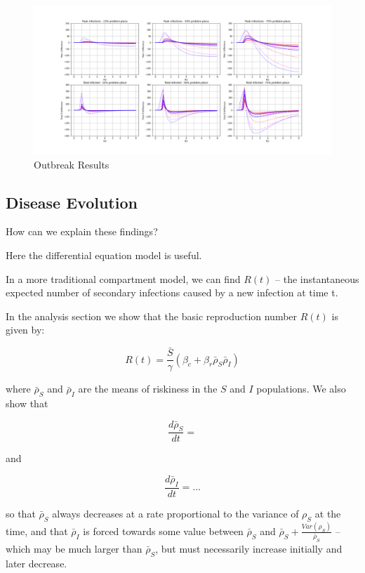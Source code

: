 \documentclass{article}
\begin{document}
\begin{figure}
\centering
\includegraphics[width=\textwidth]{outbreakresults}
\caption{Outbreak Results}
\label{fig:outbreak_results}
\end{figure}


\subsection{Disease Evolution}

How can we explain these findings?

Here the differential equation model is useful.

In a more traditional compartment model, we can find $R(t)$ – the instantaneous
expected number of secondary infections caused by a new infection at time t.

In the analysis section we show that the basic reproduction number $R(t)$ is
given by:

$$R(t) = \frac{\bar S}{\gamma} \left( \beta_c
		+ \beta_r \bar \rho_S \bar \rho_I \right)$$

where $\bar\rho_S$ and $\bar\rho_I$ are the means of riskiness in the $S$ and
$I$ populations. We also show that


\begin{equation}
\frac{d\bar\rho_S}{dt} = 
\end{equation}

and

$$\frac{d\bar\rho_I}{dt} = ...$$

so that $\bar\rho_S$ always decreases at a rate proportional to the
variance of $\rho_S$ at the time, and that $\bar\rho_I$ is forced towards
some value between $\bar\rho_S$ and $\bar\rho_S + \frac{Var(\rho_S)}{\bar\rho_S}$
– which may be much larger than $\bar\rho_S$, but must necessarily increase
initially and later decrease.
\end{document}
